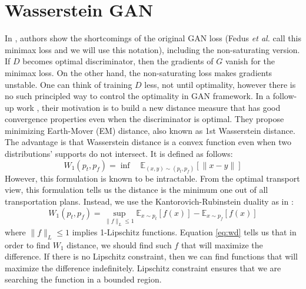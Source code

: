 \documentclass[a4paper,onesided,12pt]{report}
\begin{document}
\section{Wasserstein GAN}
\label{sec:wgan}
In \cite{principledmethods}, authors show the shortcomings of the original GAN loss (Fedus \textit{et al.} \cite{manypaths} call this minimax loss and we will use this notation), including the non-saturating version. If $D$ becomes optimal discriminator, then the gradients of $G$ vanish for the minimax loss. On the other hand, the non-saturating loss makes gradients unstable. One can think of training $D$ less, not until optimality, however there is no such principled way to control the optimality in GAN framework. In a follow-up work \cite{arjovsky2017wasserstein}, their motivation is to build a new distance measure that has good convergence properties even when the discriminator is optimal. They propose minimizing Earth-Mover (EM) distance, also known as 1st Wasserstein distance. The advantage is that Wasserstein distance is a convex function even when two distributions' supports do not intersect. It is defined as follows:
\begin{equation}
W_1(p_t, p_f) = \inf \quad \mathbb{E}_{(x,y) \sim (p_t, p_f)} [ \| x-y \| ]
\label{eq:emd}
\end{equation}
However, this formulation is known to be intractable. From the optimal transport view, this formulation tells us the distance is the minimum one out of all transportation plans. Instead, we use the Kantorovich-Rubinstein duality as in \cite{arjovsky2017wasserstein}:
\begin{equation}
W_1(p_t, p_f) = \underset{\|f\|_L \leq 1}{\sup} \mathbb{E}_{x\sim p_t} [f(x)] - \mathbb{E}_{x \sim p_f} [f(x)]
\label{eq:wd}
\end{equation}
where $\|f\|_L \leq 1$ implies 1-Lipschitz functions. Equation \ref{eq:wd} tells us that in order to find $W_1$ distance, we should find such $f$ that will maximize the difference. If there is no Lipschitz constraint, then we can find functions that will maximize the difference indefinitely. Lipschitz constraint ensures that we are searching the function in a bounded region.
\end{document}
